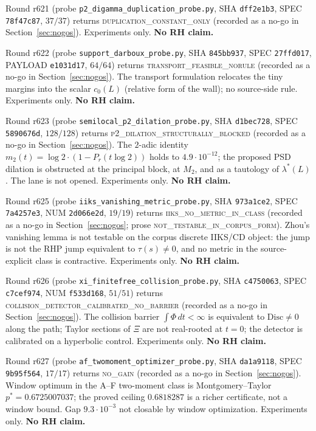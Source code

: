 \documentclass[11pt]{article}
\theoremstyle{definition}
\theoremstyle{remark}
\begin{document}
\noindent Round r621 (probe \texttt{p2\_digamma\_duplication\_probe.py},
SHA \texttt{dff2e1b3}, SPEC \texttt{78f47c87}, $37/37$) returns
\textsc{duplication\_constant\_only} (recorded as a no-go in
Section~\ref{sec:nogos}).  Experiments only.
\textbf{No RH claim.}

\noindent Round r622 (probe \texttt{support\_darboux\_probe.py},
SHA \texttt{845bb937}, SPEC \texttt{27ffd017}, PAYLOAD
\texttt{e1031d17}, $64/64$) returns
\textsc{transport\_feasible\_norule} (recorded as a no-go in
Section~\ref{sec:nogos}).  The transport formulation relocates
the tiny margins into the scalar $c_0(L)$ (relative form of
the wall); no source-side rule.  Experiments only.
\textbf{No RH claim.}

\noindent Round r623 (probe \texttt{semilocal\_p2\_dilation\_probe.py},
SHA \texttt{d1bec728}, SPEC \texttt{5890676d}, $128/128$) returns
\textsc{p2\_dilation\_structurally\_blocked} (recorded as a no-go
in Section~\ref{sec:nogos}).  The $2$-adic identity
$m_2(t)=\log 2\cdot(1-P_r(t\log 2))$ holds to
$4.9\cdot10^{-12}$; the proposed PSD dilation is obstructed at
the principal block, at $M_2$, and as a tautology of
$\lambda^*(L)$.  The lane is not opened.  Experiments only.
\textbf{No RH claim.}

\noindent Round r625 (probe \texttt{iiks\_vanishing\_metric\_probe.py},
SHA \texttt{973a1ce2}, SPEC \texttt{7a4257e3}, NUM
\texttt{2d066e2d}, $19/19$) returns
\textsc{iiks\_no\_metric\_in\_class} (recorded as a no-go in
Section~\ref{sec:nogos}; prose
\textsc{not\_testable\_in\_corpus\_form}).  Zhou's vanishing
lemma is not testable on the corpus discrete IIKS/CD object:
the jump is not the RHP jump equivalent to $\tau(s)\ne0$, and
no metric in the source-explicit class is contractive.
Experiments only.  \textbf{No RH claim.}

\noindent Round r626 (probe \texttt{xi\_finitefree\_collision\_probe.py},
SHA \texttt{c4750063}, SPEC \texttt{c7cef974}, NUM
\texttt{f533d168}, $51/51$) returns
\textsc{collision\_detector\_calibrated\_no\_barrier}
(recorded as a no-go in Section~\ref{sec:nogos}).  The
collision barrier $\int\Phi\,dt<\infty$ is equivalent to
$\mathrm{Disc}\ne0$ along the path; Taylor sections of $\Xi$
are not real-rooted at $t=0$; the detector is calibrated on a
hyperbolic control.  Experiments only.  \textbf{No RH claim.}

\noindent Round r627 (probe \texttt{af\_twomoment\_optimizer\_probe.py},
SHA \texttt{da1a9118}, SPEC \texttt{9b95f564}, $17/17$) returns
\textsc{no\_gain} (recorded as a no-go in
Section~\ref{sec:nogos}).  Window optimum in the A--F two-moment
class is Montgomery--Taylor $p^*=0.6725007037$; the proved ceiling
$0.6818287$ is a richer certificate, not a window bound.  Gap
$9.3\cdot10^{-3}$ not closable by window optimization.
Experiments only.  \textbf{No RH claim.}
\end{document}
